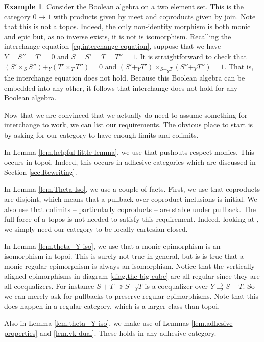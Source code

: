 \documentclass[11pt]{amsart}
\theoremstyle{remark}
\theoremstyle{definition}
\newtheorem{ex}[thm]{Example}
\begin{document}
\begin{ex}
	Consider the Boolean algebra on a two element set.  This is the category $0 \to 1$ with products given by meet and coproducts given by join. Note that this is not a topos. Indeed, the only non-identity morphism is both monic and epic but, as no inverse exists, it is not is isomorphism. Recalling the interchange equation \eqref{eq.interchange equation}, suppose that we have $Y=S''=T'=0$ and $S=S'=T=T''=1$.  It is straightforward to check that $(S' \times_S S'') +_Y (T' \times_T T'') = 0$ and $(S' +_Y T') \times_{S+_YT} (S''+_YT'')=1$. That is, the interchange equation does not hold.  Because this Boolean algebra can be embedded into any other, it follows that interchange does not hold for any Boolean algebra.
\end{ex}

Now that we are convinced that we actually do need to assume something for interchange to work, we can list our requirements.  The obvious place to start is by asking for our category to have enough limits and colimits.  

In Lemma \ref{lem.helpful little lemma}, we use that pushouts respect monics.  This occurs in topoi. Indeed, this occurs in adhesive categories which are discussed in Section \ref{sec.Rewriting}.  

In Lemma \ref{lem.Theta Iso}, we use a couple of facts.  First, we use that coproducts are disjoint, which means that a pullback over coproduct inclusions is initial. We also use that colimits -- particularly coproducts -- are stable under pullback.  The full force of a topos is not needed to satisfy this requirement.  Indeed, looking at \cite[Thm.~1.4.9]{MacLaneMoerdijk_SheavesGeomLogic}, we simply need our category to be locally cartesian closed.  

In Lemma \ref{lem.theta_Y iso}, we use that a monic epimorphism is an isomorphism in topoi. This is surely not true in general, but is is true that a monic regular epimorphism is always an isomorphism.  Notice that the vertically aligned epimorphisms in diagram \eqref{diag.the big cube} are all regular since they are all coequalizers. For instance $S+T \twoheadrightarrow S+_YT$ is a coequalizer over $Y \rightrightarrows S+T$.  So we can merely ask for pullbacks to preserve regular epimorphisms. Note that this does happen in a regular category, which is a larger class than topoi.   

Also in Lemma \ref{lem.theta_Y iso}, we make use of Lemmas \ref{lem.adhesive properties} and \ref{lem.vk dual}.  These holds in any adhesive category. 
\end{document}
